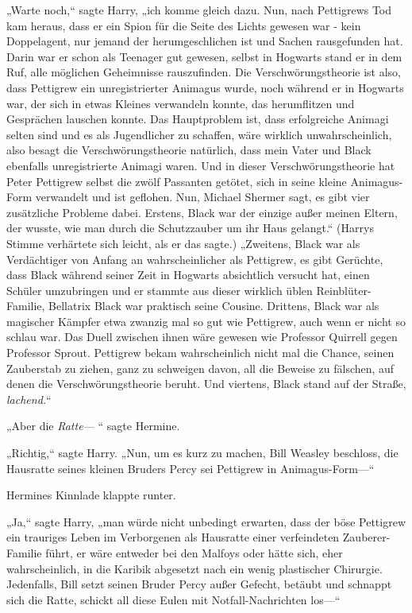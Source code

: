 {„Warte noch,“ sagte Harry, „ich komme gleich dazu. Nun, nach Pettigrews Tod kam heraus, dass er ein Spion für die Seite des Lichts gewesen war - kein Doppelagent, nur jemand der herumgeschlichen ist und Sachen rausgefunden hat. Darin war er schon als Teenager gut gewesen, selbst in Hogwarts stand er in dem Ruf, alle möglichen Geheimnisse rauszufinden. Die Verschwörungstheorie ist also, dass Pettigrew ein unregistrierter Animagus wurde, noch während er in Hogwarts war, der sich in etwas Kleines verwandeln konnte, das herumflitzen und Gesprächen lauschen konnte. Das Hauptproblem ist, dass erfolgreiche Animagi selten sind und es als Jugendlicher zu schaffen, wäre wirklich unwahrscheinlich, also besagt die Verschwörungstheorie natürlich, dass mein Vater und Black ebenfalls unregistrierte Animagi waren. Und in dieser Verschwörungstheorie hat Peter Pettigrew selbst die zwölf Passanten getötet, sich in seine kleine Animagus-Form verwandelt und ist geflohen. Nun, Michael Shermer sagt, es gibt vier zusätzliche Probleme dabei. Erstens, Black war der einzige außer meinen Eltern, der wusste, wie man durch die Schutzzauber um ihr Haus gelangt.“ (Harrys Stimme verhärtete sich leicht, als er das sagte.) „Zweitens, Black war als Verdächtiger von Anfang an wahrscheinlicher als Pettigrew, es gibt Gerüchte, dass Black während seiner Zeit in Hogwarts absichtlich versucht hat, einen Schüler umzubringen und er stammte aus dieser wirklich üblen Reinblüter-Familie, Bellatrix Black war praktisch seine Cousine. Drittens, Black war als magischer Kämpfer etwa zwanzig mal so gut wie Pettigrew, auch wenn er nicht so schlau war. Das Duell zwischen ihnen wäre gewesen wie Professor Quirrell gegen Professor Sprout. Pettigrew bekam wahrscheinlich nicht mal die Chance, seinen Zauberstab zu ziehen, ganz zu schweigen davon, all die Beweise zu fälschen, auf denen die Verschwörungstheorie beruht. Und viertens, Black stand auf der Straße, \emph{lachend.}“

„Aber die \emph{Ratte—} “ sagte Hermine.

„Richtig,“ sagte Harry. „Nun, um es kurz zu machen, Bill Weasley beschloss, die Hausratte seines kleinen Bruders Percy sei Pettigrew in Animagus-Form—“

Hermines Kinnlade klappte runter.

„Ja,“ sagte Harry, „man würde nicht unbedingt erwarten, dass der böse Pettigrew ein trauriges Leben im Verborgenen als Hausratte einer verfeindeten Zauberer-Familie führt, er wäre entweder bei den Malfoys oder hätte sich, eher wahrscheinlich, in die Karibik abgesetzt nach ein wenig plastischer Chirurgie. Jedenfalls, Bill setzt seinen Bruder Percy außer Gefecht, betäubt und schnappt sich die Ratte, schickt all diese Eulen mit Notfall-Nachrichten los—“

}
